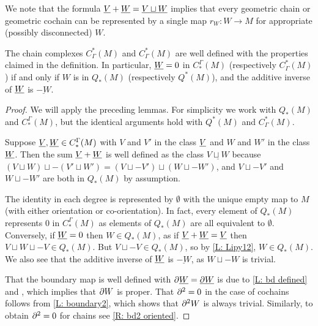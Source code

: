 We note that the formula $\underline{V} + \underline{W} = \underline{V \sqcup W}$ implies that every geometric chain or geometric cochain can be represented by a single map $r_W \colon W \to M$ for appropriate (possibly disconnected) $W$.


\begin{lemma}\label{L: co/chains well defined}
	The chain complexes $C_\Gamma^*(M)$ and $C_\Gamma^*(M)$ are well defined with the properties claimed in the definition.
	In particular, $\underline{W} = 0$ in $C^\Gamma_*(M)$ (respectively $C_\Gamma^*(M)$) if and only if $W$ is in $Q_*(M)$ (respectively $Q^*(M)$), and the additive inverse of $\underline{W}$ is $\underline{-W}$.
\end{lemma}

\begin{proof}
	We will apply the preceding lemmas.
	For simplicity we work with $Q_*(M)$ and $C^\Gamma_*(M)$, but the identical arguments hold with $Q^*(M)$ and $C_\Gamma^*(M)$.

	Suppose $\underline{V},\underline{W} \in C^\Gamma_*(M)$ with $V$ and $V'$ in the class $\underline{V}$ and $W$ and $W'$ in the class $\underline{W}$.
	Then the sum $\underline{V}+\underline{W}$ is well defined as the class $\underline{V \sqcup W}$ because $(V \sqcup W) \sqcup -(V' \sqcup W') = (V \sqcup -V') \sqcup (W \sqcup -W')$, and $V \sqcup -V'$ and $W \sqcup -W'$ are both in $Q_*(M)$ by assumption.

	The identity in each degree is represented by $\emptyset$ with the unique empty map to $M$ (with either orientation or co-orientation).
	In fact, every element of $Q_*(M)$ represents $0$ in $C^\Gamma_*(M)$ as elements of $Q_*(M)$ are all equivalent to $\emptyset$.
	Conversely, if $\underline{W} = 0$ then $W \in Q_*(M)$, as if $\underline{V}+\underline{W} = \underline{V}$ then $V \sqcup W \sqcup -V \in Q_*(M)$.
	But $V \sqcup -V \in Q_*(M)$, so by \cref{L: Lipy12}, $W \in Q_*(M)$.
	We also see that the additive inverse of $\underline{W}$ is $\underline{-W}$, as $W \sqcup -W$ is trivial.

	That the boundary map is well defined with $\partial \underline{W} = \underline{\partial W}$ is due to \cref{L: bd defined} and \cite[Lemma 2.8]{Joy12}, which implies that $\partial W$ is proper.
	That $\partial^2 = 0$ in the case of cochains follows from \cref{L: boundary2}, which shows that $\partial^2 W$ is always trivial.
	Similarly, to obtain $\partial^2 = 0$ for chains see \cref{R: bd2 oriented}.
\end{proof}

\begin{comment}
	Thom deeply considered the interplay between manifolds
	and homology \cite{Thom54}, and the cohomology classes we produce for submanifolds are equal to the pullbacks of Thom classes by Thom collapse maps.
	Similar objects were defined by Quillen \cite{Quil71} as an immediate translation of the data which encodes cobordism generalized cohomology theories.
	Thus, we name the QT-objects which represent equivalence classes of geometric cochains, defined below, in honor of Quillen and Thom.
\end{comment}

